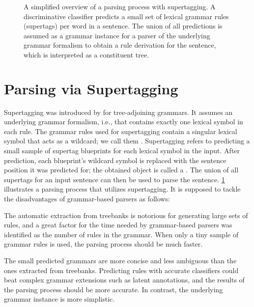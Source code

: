 \documentclass[../document.tex]{subfiles}
\begin{document}
    \begin{figure}
        \resizebox{\linewidth}{!}{}
        \caption{\label{fig:supertagging}
            A simplified overview of a parsing process with supertagging.
            A discriminative classifier predicts a small set of lexical grammar rules (supertags) per word in a sentence.
            The union of all predictions is assumed as a grammar instance for a parser of the underlying grammar formalism to obtain a rule derivation for the sentence, which is interpreted as a constituent tree.
        }
    \end{figure}
    
    \section*{Parsing via Supertagging}
    Supertagging was introduced by \citet{bangalore1999supertagging} for tree-adjoining grammars.
    It assumes an underlying  grammar formalism, i.e.\@, that contains exactly one lexical symbol in each rule.
    The grammar rules used for supertagging contain a singular lexical symbol that acts as a wildcard; we call them .
    Supertagging refers to predicting a small sample of supertag blueprints for each lexical symbol in the input.
    After prediction, each blueprint's wildcard symbol is replaced with the sentence position it was predicted for; the obtained object is called a .
    The union of all supertags for an input sentence can then be used to parse the sentence.
    \cref{fig:supertagging} illustrates a parsing process that utilizes supertagging.
    It is supposed to tackle the disadvantages of grammar-based parsers as follows:
    \begin{compactitem}
        \item The automatic extraction from treebanks is notorious for generating large sets of rules, and a great factor for the time needed by grammar-based parsers was identified as the number of rules in the grammar. \cite{dunlop2010reducing}
            When only a tiny sample of grammar rules is used, the parsing process should be much faster.
        \item The small predicted grammars are more concise and less ambiguous than the ones extracted from treebanks.
            Predicting rules with accurate classifiers could beat complex grammar extensions such as latent annotations, and the results of the parsing process should be more accurate. In contrast, the underlying grammar instance is more simplistic.
    \end{compactitem}
\end{document}
